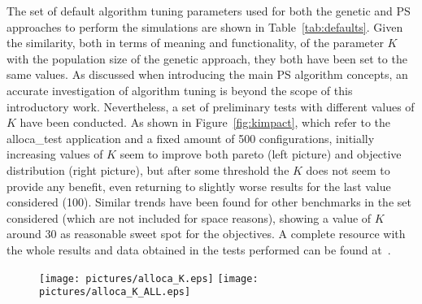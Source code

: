 The set of default algorithm tuning parameters used for both the
genetic and PS approaches to perform the simulations are shown in
Table~\ref{tab:defaults}. Given the similarity, both in terms of
meaning and functionality, of the parameter $K$ with the population size
of the genetic approach, they both have been set to the same values. As discussed
when introducing the main PS algorithm concepts, an accurate
investigation of algorithm tuning is beyond the scope of this
introductory work. Nevertheless, a set of preliminary tests with
different values of $K$ have been conducted. As shown in
Figure~\ref{fig:kimpact}, which refer to the alloca\_test application
and a fixed amount of 500 configurations, initially increasing values
of $K$ seem to improve both pareto (left picture) and objective
distribution (right picture), but after some threshold the $K$ does
not seem to provide any benefit, even returning to slightly worse
results for the last value considered (100). Similar trends have been
found for other benchmarks in the set considered (which are
not included for space reasons), showing a value of $K$ around 30 as
reasonable sweet spot for the objectives. A complete resource with the whole 
results and data obtained in the tests performed can be found
at~\cite{ps_results}.

\begin{table}
\end{table}

\begin{figure}
  \begin{center}
    \texttt{[image: pictures/alloca\_K.eps]} 
    \texttt{[image: pictures/alloca\_K\_ALL.eps]} 
  \end{center}
\end{figure}

